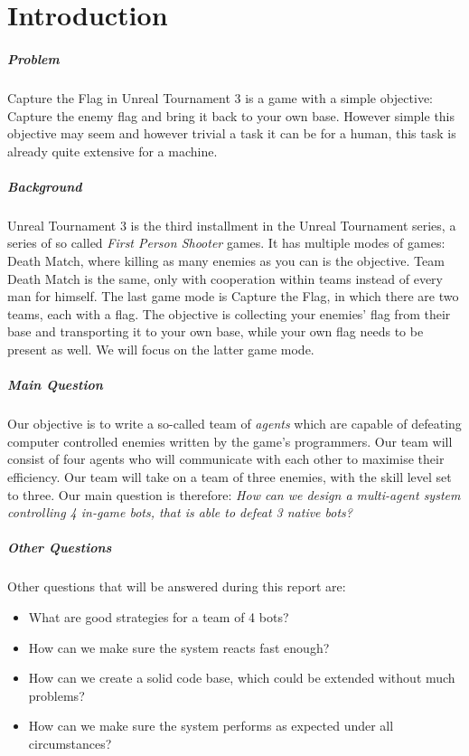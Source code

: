 \chapter{Introduction}

\paragraph{Problem}
Capture the Flag in Unreal Tournament 3 is a game with a simple objective: Capture the enemy flag and bring it back to your own base. However simple this objective may seem and however trivial a task it can be for a human, this task is already quite extensive for a machine.

\paragraph{Background}
Unreal Tournament 3 is the third installment in the Unreal Tournament series, a series of so called \emph{First Person Shooter} games. It has multiple modes of games: Death Match, where killing as many enemies as you can is the objective. Team Death Match is the same, only with cooperation within teams instead of every man for himself. The last game mode is Capture the Flag, in which there are two teams, each with a flag. The objective is collecting your enemies' flag from their base and transporting it to your own base, while your own flag needs to be present as well. We will focus on the latter game mode.

\paragraph{Main Question}
Our objective is to write a so-called team of \emph{agents} which are capable of defeating computer controlled enemies written by the game's programmers. Our team will consist of four agents who will communicate with each other to maximise their efficiency. Our team will take on a team of three enemies, with the skill level set to three. Our main question is therefore: \emph{How can we design a multi-agent system controlling 4 in-game bots, that is able to defeat 3 native bots?}

\paragraph{Other Questions}
Other questions that will be answered during this report are:
\begin{itemize}
	\item What are good strategies for a team of 4 bots? 
	\item How can we make sure the system reacts fast enough? 
	\item How can we create a solid code base, which could be extended without much problems? 
	\item How can we make sure the system performs as expected under all circumstances? 
\end{itemize}

